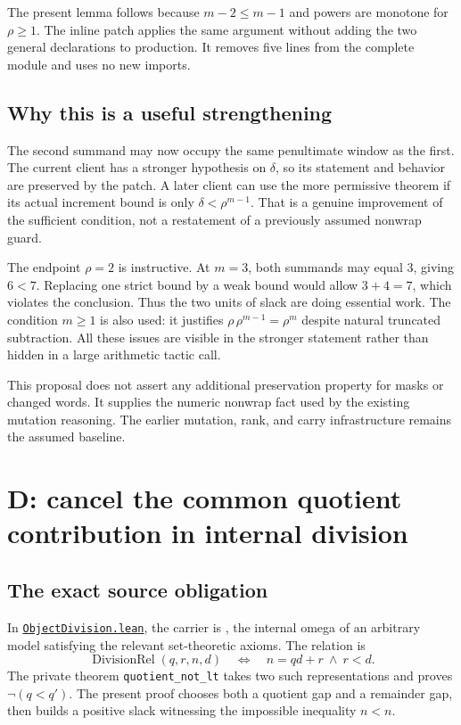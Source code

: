 \documentclass[11pt,letterpaper]{article}
\newcommand{\code}[1]{\nolinkurl{#1}}
\newcommand{\src}[2]{\href{https://github.com/VladimirReshetnikov/ProveIt/blob/9d9d1123b39927d30363f1dcd53c23f0575c30ee/Computability/DiophantineConsistency/Lean/DiophantineConsistency/#1.lean}{\code{#2}}}
\begin{document}
The present lemma follows because $m-2\le m-1$ and powers are monotone for $\rho\ge1$. The inline patch applies the same argument without adding the two general declarations to production. It removes five lines from the complete module and uses no new imports.

\subsection{Why this is a useful strengthening}

The second summand may now occupy the same penultimate window as the first. The current client has a stronger hypothesis on $\delta$, so its statement and behavior are preserved by the patch. A later client can use the more permissive theorem if its actual increment bound is only $\delta<\rho^{m-1}$. That is a genuine improvement of the sufficient condition, not a restatement of a previously assumed nonwrap guard.

The endpoint $\rho=2$ is instructive. At $m=3$, both summands may equal $3$, giving $6<7$. Replacing one strict bound by a weak bound would allow $3+4=7$, which violates the conclusion. Thus the two units of slack are doing essential work. The condition $m\ge1$ is also used: it justifies $\rho\,\rho^{m-1}=\rho^m$ despite natural truncated subtraction. All these issues are visible in the stronger statement rather than hidden in a large arithmetic tactic call.

This proposal does not assert any additional preservation property for masks or changed words. It supplies the numeric nonwrap fact used by the existing mutation reasoning. The earlier mutation, rank, and carry infrastructure remains the assumed baseline.

\section{D: cancel the common quotient contribution in internal division}

\subsection{The exact source obligation}

In \src{ObjectDivision}{ObjectDivision.lean}, the carrier is \texttt{}, the internal omega of an arbitrary model satisfying the relevant set-theoretic axioms. The relation is
\[
 \operatorname{DivisionRel}(q,r,n,d)
 \quad\Longleftrightarrow\quad n=qd+r\ \land\ r<d.
\]
The private theorem \code{quotient_not_lt} takes two such representations and proves $\neg(q<q')$. The present proof chooses both a quotient gap and a remainder gap, then builds a positive slack witnessing the impossible inequality $n<n$.
\end{document}
